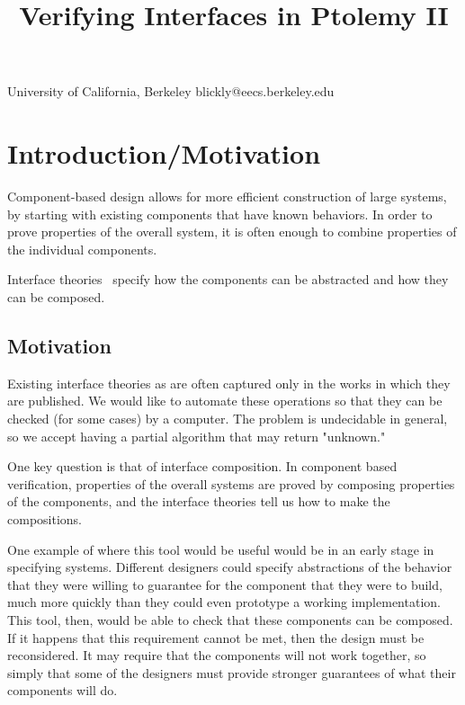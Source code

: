 \documentclass[preprint,11pt,authoryear]{sigplanconf}
\begin{document}
\title{Verifying Interfaces in Ptolemy II}

           {University of California, Berkeley}
           {blickly@eecs.berkeley.edu}

\maketitle

\newcommand{\fixme}[1]{\textcolor{red}{FIXME: #1}}

\begin{abstract}
\end{abstract}

\section{Introduction/Motivation}
Component-based design allows for more efficient construction of large systems, by starting with existing components that have known behaviors.  In order to prove properties of the overall system, it is often enough to combine properties of the individual components.

Interface theories~\cite{interfaceTheories} specify how the components can be abstracted and how they can be composed.
\subsection{Motivation}
Existing interface theories as are often captured only in the works in which they are published.  We would like to automate these operations so that they can be checked (for some cases) by a computer.  The problem is undecidable in general, so we accept having a partial algorithm that may return "unknown."

One key question is that of interface composition.  In component based verification, properties of the overall systems are proved by composing properties of the components, and the interface theories tell us how to make the compositions.

One example of where this tool would be useful would be in an early stage in specifying systems. Different designers could specify abstractions of the behavior that they were willing to guarantee for the component that they were to build, much more quickly than they could even prototype a working implementation.  This tool, then, would be able to check that these components can be composed.  If it happens that this requirement cannot be met, then the design must be reconsidered.  It may require that the components will not work together, so simply that some of the designers must provide stronger guarantees of what their components will do.
\end{document}
